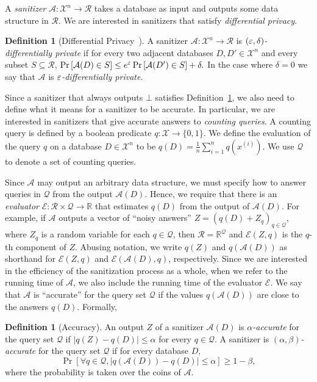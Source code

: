 \documentclass[11pt]{article}
\newcommand\R{\mathbb{R}}
\newcommand\cE{\mathcal{E}}
\newcommand\cQ{\mathcal{Q}}
\newcommand\cR{\mathcal{R}}
\newcommand\cX{\mathcal{X}}
\newcommand\san{\mathcal{A}}
\newcommand\bits{\{0,1\}}
\newcommand\from{\colon}
\newcommand{\prob}[1]{\Pr\left[#1\right]}
\theoremstyle{definition}
\newtheorem{definition}[theorem]{Definition}
\begin{document}
A \emph{sanitizer} $\san: \cX^n \to \cR$ takes a database as input and outputs some data structure in $\cR$.  We are interested in sanitizers that satisfy \emph{differential privacy}.
\begin{definition}[Differential Privacy~\cite{DworkMcNiSm06}]\label{def:dp} A sanitizer $\san\from \cX^n \to \cR$ is \emph{$(\varepsilon, \delta)$-differentially private} if for every two adjacent databases $D, D' \in \cX^n$ and every subset $S \subseteq \cR$,
$
\prob{\san(D) \in S} \leq e^{\eps} \prob{\san(D') \in S} + \delta.
$
In the case where $\delta = 0$ we say that $\san$ is \emph{$\varepsilon$-differentially private}.
\end{definition}

Since a sanitizer that always outputs $\bot$ satisfies Definition~\ref{def:dp}, we also need to define what it means for a sanitizer to be accurate.  In particular, we are interested in sanitizers that give accurate answers to \emph{counting queries}.  A counting query is defined by a boolean predicate $q\from \cX \to \bits$.  We define the evaluation of the query $q$ on a database $D \in \cX^n$ to be
$
q(D) = \frac{1}{n} \sum_{i=1}^{n} q(x^{(i)}).
$
We use $\cQ$ to denote a set of counting queries.

Since $\san$ may output an arbitrary data structure, we must specify how to answer queries in $\cQ$ from the output $\san(D)$.  Hence, we require that there is an \emph{evaluator} $\cE\from \cR \times \cQ \to \R$ that estimates $q(D)$ from the output of $\san(D)$.  For example, if $\san$ outputs a vector of ``noisy answers'' $Z = (q(D) + Z_q)_{q \in \cQ}$, where $Z_q$ is a random variable for each $q \in \cQ$, then $\cR = \R^{\cQ}$ and $\cE(Z, q)$ is the $q$-th component of $Z$.  Abusing notation, we write $q(Z)$ and $q(\san(D))$ as shorthand for $\cE(Z, q)$ and $\cE(\san(D),q)$, respectively.  Since we are interested in the efficiency of the sanitization process as a whole, when we refer to the running time of $\san$, we also include the running time of the evaluator $\cE$.  We say that $\san$ is ``accurate'' for the query set $\cQ$ if the values $q(\san(D))$ are close to the answers $q(D)$.  Formally,
\begin{definition}[Accuracy]\label{def:acc}
An output $Z$ of a sanitizer $\san(D)$ is \emph{$\alpha$-accurate} for the query set $\cQ$ if
$
|q(Z) - q(D)| \leq \alpha
$
for every $q \in \cQ$.  A sanitizer is \emph{$(\alpha, \beta)$-accurate} for the query set $\cQ$ if for every database $D$,
$$
\prob{\forall q \in \cQ, |q(\san(D)) - q(D)| \leq \alpha} \geq 1-\beta,
$$
where the probability is taken over the coins of $\san$.
\end{definition}
\end{document}
